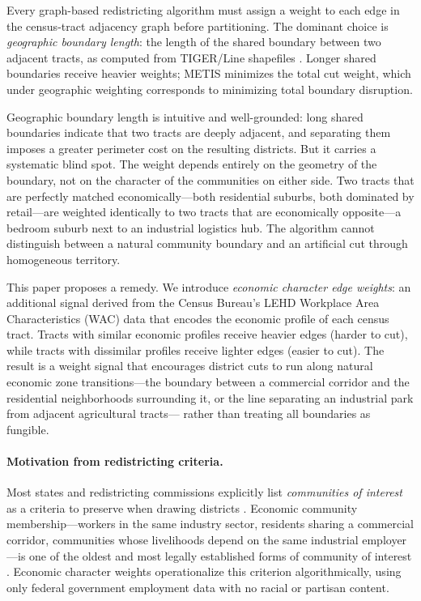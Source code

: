 \label{sec:introduction}

Every graph-based redistricting algorithm must assign a weight to each edge
in the census-tract adjacency graph before partitioning.
The dominant choice is \emph{geographic boundary length}: the length of the
shared boundary between two adjacent tracts, as computed from TIGER/Line
shapefiles \citep{census2020tiger}.
Longer shared boundaries receive heavier weights; METIS minimizes the total
cut weight, which under geographic weighting corresponds to minimizing total
boundary disruption.

Geographic boundary length is intuitive and well-grounded: long shared
boundaries indicate that two tracts are deeply adjacent, and separating them
imposes a greater perimeter cost on the resulting districts.
But it carries a systematic blind spot.
The weight depends entirely on the geometry of the boundary, not on the
character of the communities on either side.
Two tracts that are perfectly matched economically---both residential suburbs,
both dominated by retail---are weighted identically to two tracts that are
economically opposite---a bedroom suburb next to an industrial logistics hub.
The algorithm cannot distinguish between a natural community boundary and an
artificial cut through homogeneous territory.

This paper proposes a remedy.
We introduce \emph{economic character edge weights}: an additional signal
derived from the Census Bureau's LEHD Workplace Area Characteristics (WAC)
data that encodes the economic profile of each census tract.
Tracts with similar economic profiles receive heavier edges (harder to cut),
while tracts with dissimilar profiles receive lighter edges (easier to cut).
The result is a weight signal that encourages district cuts to run
along natural economic zone transitions---the boundary between a
commercial corridor and the residential neighborhoods surrounding it,
or the line separating an industrial park from adjacent agricultural tracts---
rather than treating all boundaries as fungible.

\paragraph{Motivation from redistricting criteria.}
Most states and redistricting commissions explicitly list
\emph{communities of interest} as a criteria to preserve when drawing
districts \citep{ncsl2021criteria}.
Economic community membership---workers in the same industry sector,
residents sharing a commercial corridor, communities whose livelihoods
depend on the same industrial employer---is one of the oldest and most
legally established forms of community of interest \citep{caprop11,azircprop106}.
Economic character weights operationalize this criterion algorithmically,
using only federal government employment data with no racial or partisan content.

